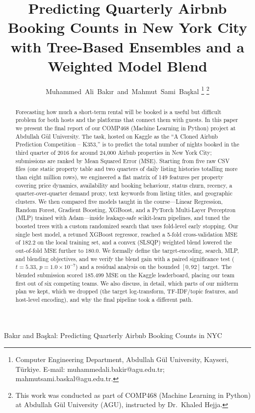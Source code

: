 \documentclass[journal]{IEEEtran}
\begin{document}
\title{Predicting Quarterly Airbnb Booking Counts in New York City with
Tree-Based Ensembles and a Weighted Model Blend}

\author{Muhammed~Ali~Bak{\i}r~and~Mahmut~Sami~Ba\c{s}kal%
\thanks{Computer Engineering Department, Abdullah G\"ul University,
Kayseri, T\"urkiye.
E-mail: muhammedali.bakir@agu.edu.tr; mahmutsami.baskal@agu.edu.tr.}%
\thanks{This work was conducted as part of COMP468 (Machine Learning in Python)
at Abdullah G\"ul University (AGU), instructed by Dr.\ Khaled Hejja.}}

%
{Bak{\i}r and Ba\c{s}kal: Predicting Quarterly Airbnb Booking Counts in NYC}

\maketitle

\begin{abstract}
Forecasting how much a short-term rental will be booked is a useful but
difficult problem for both hosts and the platforms that connect them with
guests. In this paper we present the final report of our COMP468 (Machine
Learning in Python) project at Abdullah G\"ul University. The task, hosted on
Kaggle as the ``A Cloned Airbnb Prediction Competition -- K353,'' is to predict
the total number of nights booked in the third quarter of 2016 for around
24{,}000 Airbnb properties in New York City; submissions are ranked by Mean
Squared Error (MSE). Starting from five raw CSV files (one static property
table and two quarters of daily listing histories totalling more than eight
million rows), we engineered a flat matrix of 149 features per property
covering price dynamics, availability and booking behaviour, status churn,
recency, a quarter-over-quarter demand proxy, text keywords from listing
titles, and geographic clusters. We then compared five models taught in the
course---Linear Regression, Random Forest, Gradient Boosting, XGBoost, and a
PyTorch Multi-Layer Perceptron (MLP) trained with Adam---inside leakage-safe
scikit-learn pipelines, and tuned the boosted trees with a custom randomized
search that uses fold-level early stopping. Our single best model, a retuned
XGBoost regressor, reached a 5-fold cross-validation MSE of 182.2 on the local
training set, and a convex (SLSQP) weighted blend lowered the out-of-fold MSE
further to 180.0. We formally define the target-encoding, search, MLP, and
blending objectives, and we verify the blend gain with a paired significance
test ($t=5.33$, $p=1.0\times10^{-7}$) and a residual analysis on the bounded
$[0,92]$ target. The blended submission scored 185.499 MSE on the Kaggle
leaderboard, placing our team first out of six competing teams. We also
discuss, in detail, which parts of our midterm plan we kept, which we dropped
(the target log-transform, TF-IDF/topic features, and host-level encoding), and
why the final pipeline took a different path.
\end{abstract}
\end{document}
